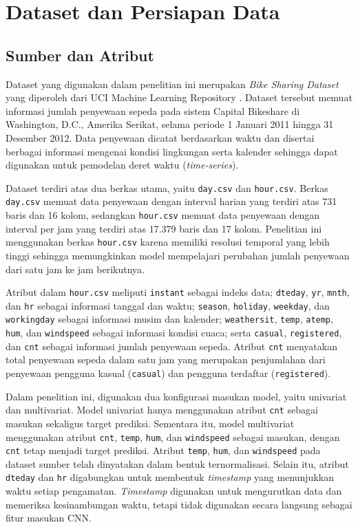 \documentclass[10pt,conference]{IEEEtran}
\begin{document}
\section{Dataset dan Persiapan Data}

\subsection{Sumber dan Atribut}

Dataset yang digunakan dalam penelitian ini merupakan \textit{Bike Sharing Dataset} yang diperoleh dari UCI Machine Learning Repository \cite{dataset}. Dataset tersebut memuat informasi jumlah penyewaan sepeda pada sistem Capital Bikeshare di Washington, D.C., Amerika Serikat, selama periode 1 Januari 2011 hingga 31 Desember 2012. Data penyewaan dicatat berdasarkan waktu dan disertai berbagai informasi mengenai kondisi lingkungan serta kalender sehingga dapat digunakan untuk pemodelan deret waktu (\textit{time-series}).

Dataset terdiri atas dua berkas utama, yaitu \texttt{day.csv} dan \texttt{hour.csv}. Berkas \texttt{day.csv} memuat data penyewaan dengan interval harian yang terdiri atas 731 baris dan 16 kolom, sedangkan \texttt{hour.csv} memuat data penyewaan dengan interval per jam yang terdiri atas 17.379 baris dan 17 kolom. Penelitian ini menggunakan berkas \texttt{hour.csv} karena memiliki resolusi temporal yang lebih tinggi sehingga memungkinkan model mempelajari perubahan jumlah penyewaan dari satu jam ke jam berikutnya.

Atribut dalam \texttt{hour.csv} meliputi \texttt{instant} sebagai indeks data; \texttt{dteday}, \texttt{yr}, \texttt{mnth}, dan \texttt{hr} sebagai informasi tanggal dan waktu; \texttt{season}, \texttt{holiday}, \texttt{weekday}, dan \texttt{workingday} sebagai informasi musim dan kalender; \texttt{weathersit}, \texttt{temp}, \texttt{atemp}, \texttt{hum}, dan \texttt{windspeed} sebagai informasi kondisi cuaca; serta \texttt{casual}, \texttt{registered}, dan \texttt{cnt} sebagai informasi jumlah penyewaan sepeda. Atribut \texttt{cnt} menyatakan total penyewaan sepeda dalam satu jam yang merupakan penjumlahan dari penyewaan pengguna kasual (\texttt{casual}) dan pengguna terdaftar (\texttt{registered}).

Dalam penelitian ini, digunakan dua konfigurasi masukan model, yaitu univariat dan multivariat. Model univariat hanya menggunakan atribut \texttt{cnt} sebagai masukan sekaligus target prediksi. Sementara itu, model multivariat menggunakan atribut \texttt{cnt}, \texttt{temp}, \texttt{hum}, dan \texttt{windspeed} sebagai masukan, dengan \texttt{cnt} tetap menjadi target prediksi. Atribut \texttt{temp}, \texttt{hum}, dan \texttt{windspeed} pada dataset sumber telah dinyatakan dalam bentuk ternormalisasi. Selain itu, atribut \texttt{dteday} dan \texttt{hr} digabungkan untuk membentuk \textit{timestamp} yang menunjukkan waktu setiap pengamatan. \textit{Timestamp} digunakan untuk mengurutkan data dan memeriksa kesinambungan waktu, tetapi tidak digunakan secara langsung sebagai fitur masukan CNN.
\end{document}
